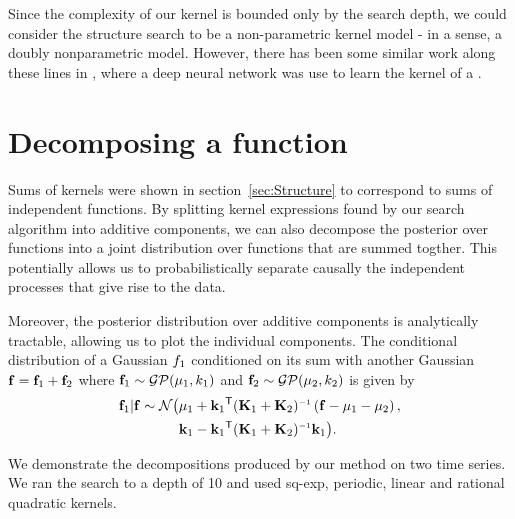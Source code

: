 \documentclass[twoside]{article}
\begin{document}
Since the complexity of our kernel is bounded only by the search depth, we could consider the structure search to be a non-parametric kernel model - in a sense, a doubly nonparametric model.  However, there has been some similar work along these lines in \cite{salakhutdinov2008using}, where a deep neural network was use to learn the kernel of a \gp{}.


\section{Decomposing a function}

Sums of kernels were shown in section~\ref{sec:Structure} to correspond to sums of independent functions.
By splitting kernel expressions found by our search algorithm into additive components, we can also decompose the \gp{} posterior over functions into a joint distribution over functions that are summed togther.
This potentially allows us to probabilistically separate causally the independent processes that give rise to the data.

Moreover, the posterior distribution over additive components is analytically tractable, allowing us to plot the individual components.
The conditional distribution of a Gaussian $f_1$ conditioned on its sum with another Gaussian ${\bf{f}} = {\bf{f}}_1 + {\bf{f}}_2$ where ${\bf{f}}_1 \sim \mathcal{GP}( {\bf{\mu}}_1, k_1)$ and ${\bf{f}}_2 \sim \mathcal{GP}( {\bf{\mu}}_2, k_2)$ is given by
\begin{align}
\vf_1 | \vf \sim \mathcal{N} \big( & \vmu_1 + \vk_1\tra (\vK_1 + \vK_2)\inv \left( \vf - \vmu_1 - \vmu_2 \right), \nonumber \\
& \vk_1 - \vk_1\tra (\vK_1 + \vK_2)\inv \vk_1 \big).
\end{align}


We demonstrate the decompositions produced by our method on two time series.
We ran the search to a depth of 10 and used sq-exp, periodic, linear and rational quadratic kernels.

% 
\end{document}
